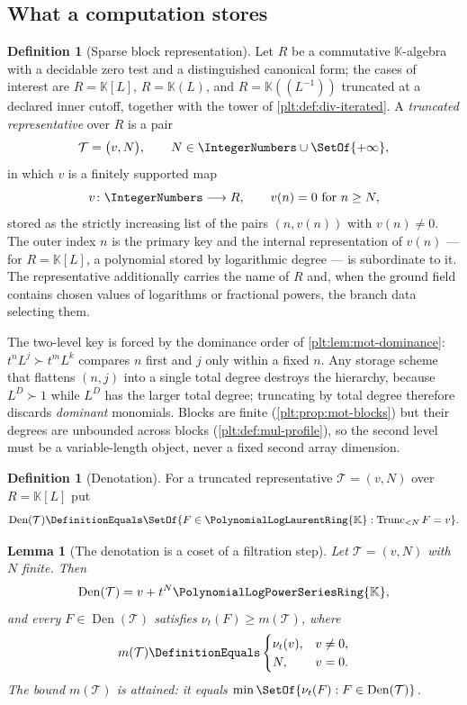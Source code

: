 \documentclass[11pt,oneside]{article}
\theoremstyle{plain}
\newtheorem{lemma}[theorem]{Lemma}
\theoremstyle{definition}
\newtheorem{definition}[theorem]{Definition}
\theoremstyle{remark}
\newcommand{\K}{\mathbb{K}}
\newcommand{\PLpow}{\PolynomialLogPowerSeriesRing{\K}}   %
\newcommand{\PLlau}{\PolynomialLogLaurentRing{\K}}       %
\newcommand{\ordt}{\nu_{t}}                              %
\newcommand{\Trunc}[2]{\operatorname{Trunc}_{<#2}#1}     %
\newcommand{\succdom}{\succ}
\begin{document}
\subsection{What a computation stores}
\label{plt:sec:alg-storage}

\begin{definition}[Sparse block representation]\label{plt:def:alg-representation}
Let \(R\) be a commutative \(\K\)-algebra with a decidable zero test and a
distinguished canonical form; the cases of interest are
\(R=\K[L]\), \(R=\K(L)\), and \(R=\K((L^{-1}))\) truncated at a declared inner
cutoff, together with the tower of \cref{plt:def:div-iterated}.  A
\emph{truncated representative} over \(R\) is a pair
\[
 \mathcal T=\bigl(v,N\bigr),
 \qquad
 N\in\IntegerNumbers\cup\SetOf{+\infty},
\]
in which \(v\) is a finitely supported map
\[
 v\colon \IntegerNumbers\longrightarrow R,
 \qquad
 v(n)=0\ \text{for}\ n\ge N,
\]
stored as the strictly increasing list of the pairs \((n,v(n))\) with
\(v(n)\ne0\).  The outer index \(n\) is the primary key and the internal
representation of \(v(n)\) --- for \(R=\K[L]\), a polynomial stored by
logarithmic degree --- is subordinate to it.  The representative additionally
carries the name of \(R\) and, when the ground field contains chosen values of
logarithms or fractional powers, the branch data selecting them.
\end{definition}

The two-level key is forced by the dominance order of
\cref{plt:lem:mot-dominance}: \(t^nL^j\succdom t^mL^k\) compares \(n\) first
and \(j\) only within a fixed \(n\).  Any storage scheme that flattens
\((n,j)\) into a single total degree destroys the hierarchy, because
\(L^{D}\succdom1\) while \(L^D\) has the larger total degree; truncating by
total degree therefore discards \emph{dominant} monomials.  Blocks are finite
(\cref{plt:prop:mot-blocks}) but their degrees are unbounded across blocks
(\cref{plt:def:mul-profile}), so the second level must be a variable-length
object, never a fixed second array dimension.

\begin{definition}[Denotation]\label{plt:def:alg-denotation}
For a truncated representative \(\mathcal T=(v,N)\) over \(R=\K[L]\) put
\[
 \operatorname{Den}(\mathcal T)
 \DefinitionEquals
 \SetOf{F\in\PLlau:\Trunc{F}{N}=v}.
\]
\end{definition}

\begin{lemma}[The denotation is a coset of a filtration step]
\label{plt:lem:alg-denotation-coset}
Let \(\mathcal T=(v,N)\) with \(N\) finite.  Then
\[
 \operatorname{Den}(\mathcal T)=v+t^N\PLpow,
\]
and every \(F\in\operatorname{Den}(\mathcal T)\) satisfies \(\ordt(F)\ge m(\mathcal T)\),
where
\[
 m(\mathcal T)
 \DefinitionEquals
 \begin{cases}
  \ordt(v),&v\ne0,\\
  N,&v=0.
 \end{cases}
\]
The bound \(m(\mathcal T)\) is attained: it equals
\(\min\SetOf{\ordt(F):F\in\operatorname{Den}(\mathcal T)}\).
\end{lemma}
\end{document}
